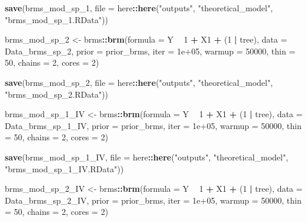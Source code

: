 \documentclass[
]{article}
\newenvironment{Shaded}{\begin{snugshade}}{\end{snugshade}}
\newcommand{\DataTypeTok}[1]{\textcolor[rgb]{0.13,0.29,0.53}{#1}}
\newcommand{\DecValTok}[1]{\textcolor[rgb]{0.00,0.00,0.81}{#1}}
\newcommand{\FloatTok}[1]{\textcolor[rgb]{0.00,0.00,0.81}{#1}}
\newcommand{\KeywordTok}[1]{\textcolor[rgb]{0.13,0.29,0.53}{\textbf{#1}}}
\newcommand{\NormalTok}[1]{#1}
\newcommand{\OperatorTok}[1]{\textcolor[rgb]{0.81,0.36,0.00}{\textbf{#1}}}
\newcommand{\StringTok}[1]{\textcolor[rgb]{0.31,0.60,0.02}{#1}}
\begin{document}
\begin{Shaded}
\begin{Highlighting}[]
\KeywordTok{save}\NormalTok{(brms_mod_sp_}\DecValTok{1}\NormalTok{, }\DataTypeTok{file =}\NormalTok{ here}\OperatorTok{::}\KeywordTok{here}\NormalTok{(}\StringTok{"outputs"}\NormalTok{, }\StringTok{"theoretical_model"}\NormalTok{, }
    \StringTok{"brms_mod_sp_1.RData"}\NormalTok{))}

\NormalTok{brms_mod_sp_}\DecValTok{2}\NormalTok{ <-}\StringTok{ }\NormalTok{brms}\OperatorTok{::}\KeywordTok{brm}\NormalTok{(}\DataTypeTok{formula =}\NormalTok{ Y }\OperatorTok{~}\StringTok{ }\DecValTok{1} \OperatorTok{+}\StringTok{ }\NormalTok{X1 }\OperatorTok{+}\StringTok{ }\NormalTok{(}\DecValTok{1} \OperatorTok{|}\StringTok{ }\NormalTok{tree), }
    \DataTypeTok{data =}\NormalTok{ Data_brms_sp_}\DecValTok{2}\NormalTok{, }\DataTypeTok{prior =}\NormalTok{ prior_brms, }\DataTypeTok{iter =} \FloatTok{1e+05}\NormalTok{, }
    \DataTypeTok{warmup =} \DecValTok{50000}\NormalTok{, }\DataTypeTok{thin =} \DecValTok{50}\NormalTok{, }\DataTypeTok{chains =} \DecValTok{2}\NormalTok{, }\DataTypeTok{cores =} \DecValTok{2}\NormalTok{)}

\KeywordTok{save}\NormalTok{(brms_mod_sp_}\DecValTok{2}\NormalTok{, }\DataTypeTok{file =}\NormalTok{ here}\OperatorTok{::}\KeywordTok{here}\NormalTok{(}\StringTok{"outputs"}\NormalTok{, }\StringTok{"theoretical_model"}\NormalTok{, }
    \StringTok{"brms_mod_sp_2.RData"}\NormalTok{))}

\NormalTok{brms_mod_sp_}\DecValTok{1}\NormalTok{_IV <-}\StringTok{ }\NormalTok{brms}\OperatorTok{::}\KeywordTok{brm}\NormalTok{(}\DataTypeTok{formula =}\NormalTok{ Y }\OperatorTok{~}\StringTok{ }\DecValTok{1} \OperatorTok{+}\StringTok{ }\NormalTok{X1 }\OperatorTok{+}\StringTok{ }\NormalTok{(}\DecValTok{1} \OperatorTok{|}\StringTok{ }\NormalTok{tree), }
    \DataTypeTok{data =}\NormalTok{ Data_brms_sp_}\DecValTok{1}\NormalTok{_IV, }\DataTypeTok{prior =}\NormalTok{ prior_brms, }\DataTypeTok{iter =} \FloatTok{1e+05}\NormalTok{, }
    \DataTypeTok{warmup =} \DecValTok{50000}\NormalTok{, }\DataTypeTok{thin =} \DecValTok{50}\NormalTok{, }\DataTypeTok{chains =} \DecValTok{2}\NormalTok{, }\DataTypeTok{cores =} \DecValTok{2}\NormalTok{)}

\KeywordTok{save}\NormalTok{(brms_mod_sp_}\DecValTok{1}\NormalTok{_IV, }\DataTypeTok{file =}\NormalTok{ here}\OperatorTok{::}\KeywordTok{here}\NormalTok{(}\StringTok{"outputs"}\NormalTok{, }\StringTok{"theoretical_model"}\NormalTok{, }
    \StringTok{"brms_mod_sp_1_IV.RData"}\NormalTok{))}

\NormalTok{brms_mod_sp_}\DecValTok{2}\NormalTok{_IV <-}\StringTok{ }\NormalTok{brms}\OperatorTok{::}\KeywordTok{brm}\NormalTok{(}\DataTypeTok{formula =}\NormalTok{ Y }\OperatorTok{~}\StringTok{ }\DecValTok{1} \OperatorTok{+}\StringTok{ }\NormalTok{X1 }\OperatorTok{+}\StringTok{ }\NormalTok{(}\DecValTok{1} \OperatorTok{|}\StringTok{ }\NormalTok{tree), }
    \DataTypeTok{data =}\NormalTok{ Data_brms_sp_}\DecValTok{2}\NormalTok{_IV, }\DataTypeTok{prior =}\NormalTok{ prior_brms, }\DataTypeTok{iter =} \FloatTok{1e+05}\NormalTok{, }
    \DataTypeTok{warmup =} \DecValTok{50000}\NormalTok{, }\DataTypeTok{thin =} \DecValTok{50}\NormalTok{, }\DataTypeTok{chains =} \DecValTok{2}\NormalTok{, }\DataTypeTok{cores =} \DecValTok{2}\NormalTok{)}


\end{Highlighting}
\end{Shaded}
\end{document}
